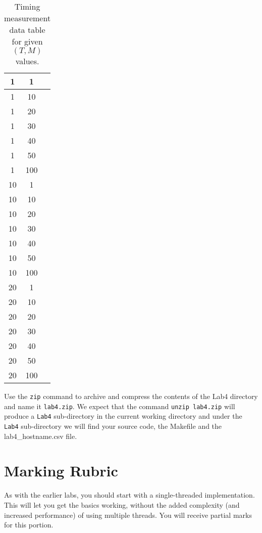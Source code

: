 \begin{enumerate}
\begin{table}[h]
\begin{center}
\begin{tabular}{|c|c|c|}
1 &    1 &    \\ \hline
1 &    10 &    \\ \hline
1 &    20 &    \\ \hline
1 &    30 &    \\ \hline
1 &    40 &    \\ \hline
1 &    50 &    \\ \hline
1 &    100 &    \\ \hline
10 &    1 &    \\ \hline
10 &    10 &    \\ \hline
10 &    20 &    \\ \hline
10 &    30 &    \\ \hline
10 &    40 &    \\ \hline
10 &    50 &    \\ \hline
10 &    100 &    \\ \hline
20 &    1 &    \\ \hline
20 &    10 &    \\ \hline
20 &    20 &    \\ \hline
20 &    30 &    \\ \hline
20 &    40 &    \\ \hline
20 &    50 &    \\ \hline
20 &    100 &    \\ \hline

\end{tabular}
\caption{Timing measurement data table for given $(T, M)$ values.}
\label{tb_timing_lab4}
\end{center}
\end{table}
\end{enumerate}
Use the \verb+zip+ command to archive and compress the contents of the Lab4 directory and name it \verb+lab4.zip+. We expect that the command \verb+unzip lab4.zip+ will produce a \verb+Lab4+ sub-directory in the current working directory and under the \verb+Lab4+ sub-directory we will find your source code, the Makefile and the lab4\_hostname.csv file.

\section{Marking Rubric}

As with the earlier labs, you should start with a single-threaded implementation. This will let you get the basics working, without the added complexity (and increased performance) of using multiple threads.
You will receive partial marks for this portion.

